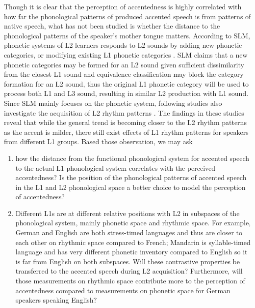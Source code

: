 Though it is clear that the perception of accentedness is highly correlated with how far the phonological patterns of produced accented speech is from patterns of native speech, what has not been studied is whether the distance to the phonological patterns of the speaker's mother tongue matters. According to SLM, phonetic systems of L2 learners responds to L2 sounds by adding new phonetic categories, or modifying existing L1 phonetic categories \citep{flege1995second}. SLM claims that a new phonetic categories may be formed for an L2 sound given sufficient dissimilarity from the closest L1 sound and equivalence classification may block the category formation for an L2 sound, thus the original L1 phonetic category will be used to process both L1 and L3 sound, resulting in similar L2 production with L1 sound. Since SLM mainly focuses on the phonetic system, following studies also investigate the acquisition of L2 rhythm patterns \citep{rasier2007prosodic,ordin2015acquisition}. The findings in these studies reveal that while the general trend is becoming closer to the L2 rhythm patterns as the accent is milder, there still exist effects of L1 rhythm patterns for speakers from different L1 groups. Based those observation, we may ask

\begin{enumerate}
\item how the distance from the functional phonological system for accented speech to the actual L1 phonological system correlates with the perceived accentedness? Is the position of the phonological patterns of accented speech in the L1 and L2 phonological space a better choice to model the perception of accentedness?
\item Different L1s are at different relative positions with L2 in subspaces of the phonological system, mainly phonetic space and rhythmic space. For example, German and English are both stress-timed languages and thus are closer to each other on rhythmic space compared to French; Mandarin is syllable-timed language and has very different phonetic inventory compared to English so it is far from English on both subspaces. Will these contrastive properties be transferred to the accented speech during L2 acquisition? Furthermore, will those measurements on rhythmic space contribute more to the perception of accentedness compared to measurements on phonetic space for German speakers speaking English?
\end{enumerate}

